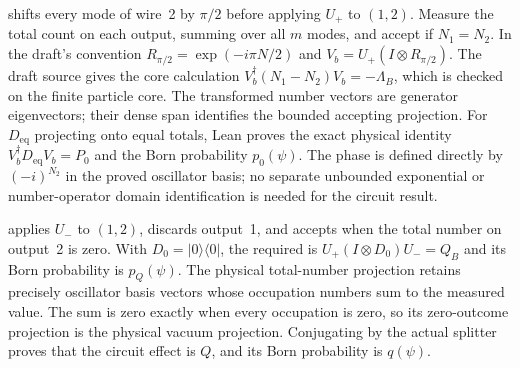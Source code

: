 \begin{theorem}\label{target:fig1-mean-zero}
  \par
  \leanok
   shifts every mode of wire~2 by $\pi/2$ before
  applying $U_+$ to $(1,2)$. Measure the total count on each output, summing
  over all $m$ modes, and accept if $N_1=N_2$. In the draft's convention
  $R_{\pi/2}=\exp(-i\pi N/2)$ and $V_b=U_+(I\otimes R_{\pi/2})$.
  The draft source gives the core calculation
  $V_b^\dagger(N_1-N_2)V_b=-\Lambda_B$, which is checked on the finite
  particle core. The transformed number vectors are generator eigenvectors;
  their dense span identifies the bounded accepting projection. For
  $D_{\mathrm{eq}}$ projecting onto equal totals, Lean proves the exact
  physical identity $V_b^\dagger D_{\mathrm{eq}}V_b=P_0$ and the Born
  probability $p_0(\psi)$. The phase is defined directly by $(-i)^{N_2}$
  in the proved oscillator basis; no separate unbounded exponential
  or number-operator domain identification is needed for the circuit result.
\end{theorem}

\begin{theorem}\label{target:fig1-coherent}
  \par
  \leanok
   applies $U_-$ to $(1,2)$, discards output~1,
  and accepts when the total number on output~2 is zero. With
  $D_0=|0\rangle\langle0|$, the required
   is
  $U_+(I\otimes D_0)U_-=Q_B$ and its Born probability is $p_Q(\psi)$.
  The physical total-number projection retains precisely oscillator basis
  vectors whose occupation numbers sum to the measured value. The sum is zero
  exactly when every occupation is zero, so its zero-outcome projection is
  the physical vacuum projection. Conjugating by the actual splitter proves
  that the circuit effect is $Q$, and its Born probability is $q(\psi)$.
\end{theorem}

